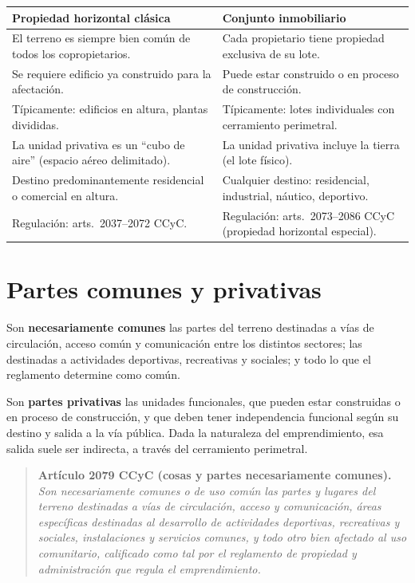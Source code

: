 \documentclass[12pt,oneside]{book}
\begin{document}
\begin{table}[H]
\centering
\small
\renewcommand{\arraystretch}{1.3}
\begin{tabularx}{\textwidth}{>{\raggedright\arraybackslash}X >{\raggedright\arraybackslash}X}
\toprule
\textbf{Propiedad horizontal clásica} & \textbf{Conjunto inmobiliario} \\
\midrule
El terreno es siempre bien común de todos los copropietarios. & Cada propietario tiene propiedad exclusiva de su lote. \\
Se requiere edificio ya construido para la afectación. & Puede estar construido o en proceso de construcción. \\
Típicamente: edificios en altura, plantas divididas. & Típicamente: lotes individuales con cerramiento perimetral. \\
La unidad privativa es un ``cubo de aire'' (espacio aéreo delimitado). & La unidad privativa incluye la tierra (el lote físico). \\
Destino predominantemente residencial o comercial en altura. & Cualquier destino: residencial, industrial, náutico, deportivo. \\
Regulación: arts.~2037--2072 CCyC. & Regulación: arts.~2073--2086 CCyC (propiedad horizontal especial). \\
\bottomrule
\end{tabularx}
\end{table}

\section{Partes comunes y privativas}

Son \textbf{necesariamente comunes} las partes del terreno destinadas a vías de circulación, acceso común y comunicación entre los distintos sectores; las destinadas a actividades deportivas, recreativas y sociales; y todo lo que el reglamento determine como común.

Son \textbf{partes privativas} las unidades funcionales, que pueden estar construidas o en proceso de construcción, y que deben tener independencia funcional según su destino y salida a la vía pública. Dada la naturaleza del emprendimiento, esa salida suele ser indirecta, a través del cerramiento perimetral.

\begin{quote}
\textbf{Artículo 2079 CCyC (cosas y partes necesariamente comunes).} \textit{Son necesariamente comunes o de uso común las partes y lugares del terreno destinadas a vías de circulación, acceso y comunicación, áreas específicas destinadas al desarrollo de actividades deportivas, recreativas y sociales, instalaciones y servicios comunes, y todo otro bien afectado al uso comunitario, calificado como tal por el reglamento de propiedad y administración que regula el emprendimiento.}
\end{quote}
\end{document}
